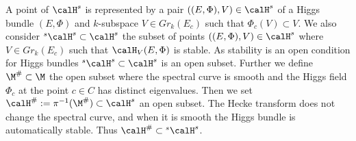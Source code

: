 A point of $\calH^s$ is represented by a pair $((E,\Phi),V) \in \calH^s$  of a Higgs bundle $(E,\Phi)$ and $k$-subspace $V\in Gr_k(E_{c})$ such that $\Phi_c(V)\subset V$.   We also consider ${}^{s}\calH^s\subset \calH^s$ the subset of points $((E,\Phi),V)\in \calH^s$ where $V\in Gr_k(E_{c})$ such that $\calH_{V}(E,\Phi)$ is stable. As stability is an open condition for Higgs bundles ${}^{s}\calH^s\subset \calH^s$ is an open subset. Further we define $\M^\#\subset\M$ the open subset where the spectral curve is smooth and the Higgs field $\Phi_c$ at the point $c\in C$ has distinct eigenvalues. Then we set $\calH^\#:=\pi^{-1}(\M^\#)\subset \calH^{s}$ an open subset.  The Hecke transform does not change the spectral curve, and when it is smooth the Higgs bundle is automatically stable. Thus $\calH^\#\subset {}^{s}\calH^s$.

